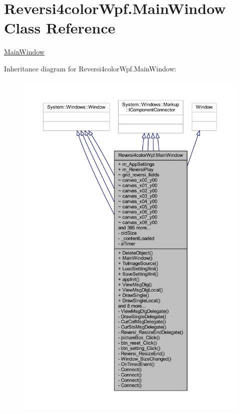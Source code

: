 \hypertarget{class_reversi4color_wpf_1_1_main_window}{}\section{Reversi4color\+Wpf.\+Main\+Window Class Reference}
\label{class_reversi4color_wpf_1_1_main_window}


\hyperlink{class_reversi4color_wpf_1_1_main_window}{Main\+Window}  




Inheritance diagram for Reversi4color\+Wpf.\+Main\+Window\+:
\nopagebreak
\begin{figure}[H]
\begin{center}
\leavevmode
\includegraphics[width=350pt]{class_reversi4color_wpf_1_1_main_window__inherit__graph}
\end{center}
\end{figure}


